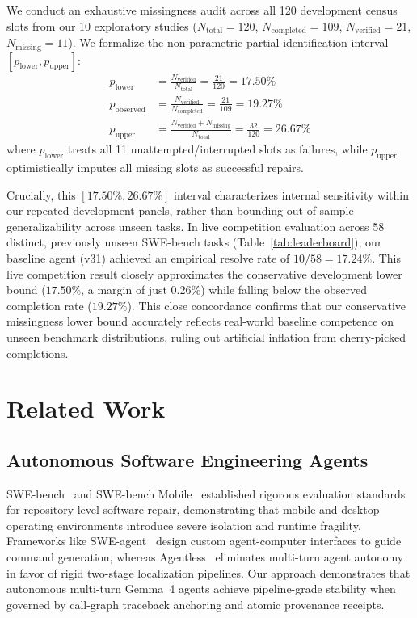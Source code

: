 \documentclass[10pt,twocolumn]{article}
\begin{document}
We conduct an exhaustive missingness audit across all 120 development census slots from our 10 exploratory studies ($N_{\text{total}}=120$, $N_{\text{completed}}=109$, $N_{\text{verified}}=21$, $N_{\text{missing}}=11$). We formalize the non-parametric partial identification interval $[p_{\text{lower}}, p_{\text{upper}}]$:
\begin{align}
    p_{\text{lower}} &= \frac{N_{\text{verified}}}{N_{\text{total}}} = \frac{21}{120} = 17.50\% \\
    p_{\text{observed}} &= \frac{N_{\text{verified}}}{N_{\text{completed}}} = \frac{21}{109} = 19.27\% \\
    p_{\text{upper}} &= \frac{N_{\text{verified}} + N_{\text{missing}}}{N_{\text{total}}} = \frac{32}{120} = 26.67\%
\end{align}
where $p_{\text{lower}}$ treats all 11 unattempted/interrupted slots as failures, while $p_{\text{upper}}$ optimistically imputes all missing slots as successful repairs.

Crucially, this $[17.50\%, 26.67\%]$ interval characterizes internal sensitivity within our repeated development panels, rather than bounding out-of-sample generalizability across unseen tasks. In live competition evaluation across 58 distinct, previously unseen SWE-bench tasks (Table~\ref{tab:leaderboard}), our baseline agent (v31) achieved an empirical resolve rate of $10/58 = 17.24\%$. This live competition result closely approximates the conservative development lower bound ($17.50\%$, a margin of just $0.26\%$) while falling below the observed completion rate ($19.27\%$). This close concordance confirms that our conservative missingness lower bound accurately reflects real-world baseline competence on unseen benchmark distributions, ruling out artificial inflation from cherry-picked completions.

\section{Related Work}

\subsection{Autonomous Software Engineering Agents}
SWE-bench~\cite{jimenez2024swebench} and SWE-bench Mobile~\cite{tian2026swemobile} established rigorous evaluation standards for repository-level software repair, demonstrating that mobile and desktop operating environments introduce severe isolation and runtime fragility. Frameworks like SWE-agent~\cite{yang2024sweagent} design custom agent-computer interfaces to guide command generation, whereas Agentless~\cite{xia2024agentless} eliminates multi-turn agent autonomy in favor of rigid two-stage localization pipelines. Our approach demonstrates that autonomous multi-turn Gemma~4 agents achieve pipeline-grade stability when governed by call-graph traceback anchoring and atomic provenance receipts.
\end{document}

